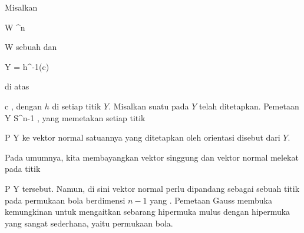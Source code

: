 
{}
{

Misalkan

\mavergleichskette
{\vergleichskette
{ W
}
{ \subseteq }{ \R^n
}
{  }{
}
{    }{
}
{   }{
}
}
{}{}{}

 { W } { \R
} {}
sebuah
dan

\mavergleichskette
{\vergleichskette
{ Y
}
{ = }{ h^{-1}(c)
}
{  }{
}
{    }{
}
{   }{
}
}
{}{}{}

di atas

\mavergleichskette
{\vergleichskette
{ c
}
{ \in }{ \R
}
{  }{
}
{    }{
}
{   }{
}
}
{}{}{,}
dengan $h$
di setiap titik $Y$. Misalkan suatu
pada $Y$ telah ditetapkan. Pemetaan
\maabbdisp {} { Y } { S^{n-1}
} {,}
yang memetakan setiap titik

\mavergleichskette
{\vergleichskette
{ P
}
{ \in }{ Y
}
{  }{
}
{    }{
}
{   }{
}
}
{}{}{}
ke vektor normal satuannya yang ditetapkan oleh orientasi disebut
dari $Y$.

}

Pada umumnya, kita membayangkan vektor singgung dan vektor normal melekat pada titik

\mavergleichskette
{\vergleichskette
{ P
}
{ \in }{ Y
}
{  }{
}
{    }{
}
{   }{
}
}
{}{}{}
tersebut. Namun, di sini vektor normal perlu dipandang sebagai sebuah titik pada permukaan bola berdimensi $n-1$ yang . Pemetaan Gauss membuka kemungkinan untuk mengaitkan sebarang hipermuka mulus dengan hipermuka yang sangat sederhana, yaitu permukaan bola.



